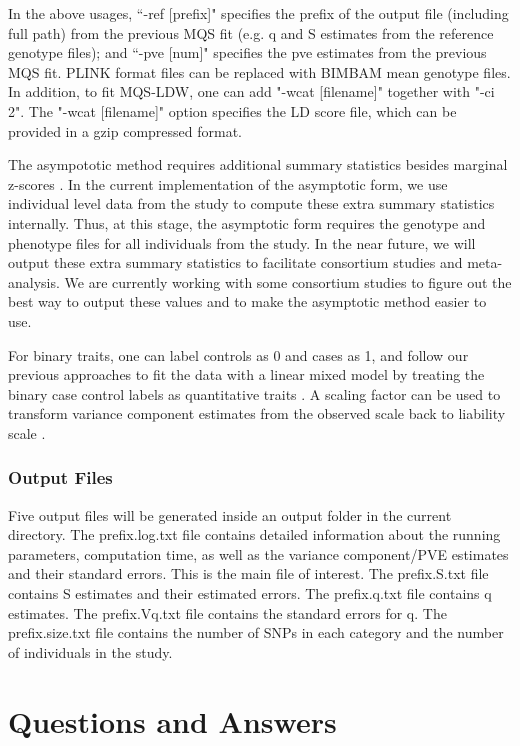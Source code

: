 \documentclass[11pt]{article}
\begin{document}
In the above usages, ``-ref [prefix]" specifies the prefix of the
output file (including full path) from the previous MQS fit (e.g. q
and S estimates from the reference genotype files); and ``-pve [num]"
specifies the pve estimates from the previous MQS fit. PLINK format
files can be replaced with BIMBAM mean genotype files. In addition, to
fit MQS-LDW, one can add "-wcat [filename]" together with "-ci 2". The
"-wcat [filename]" option specifies the LD score file, which can be
provided in a gzip compressed format.

The asympototic method requires additional summary statistics besides
marginal z-scores \cite{Zhou:2016}. In the current implementation of
the asymptotic form, we use individual level data from the study to
compute these extra summary statistics internally. Thus, at this
stage, the asymptotic form requires the genotype and phenotype files
for all individuals from the study. In the near future, we will output
these extra summary statistics to facilitate consortium studies and
meta-analysis. We are currently working with some consortium studies
to figure out the best way to output these values and to make the
asymptotic method easier to use.

For binary traits, one can label controls as 0 and cases as 1, and
follow our previous approaches to fit the data with a linear mixed
model by treating the binary case control labels as quantitative
traits \cite{Zhou:2013}. A scaling factor can be used to transform
variance component estimates from the observed scale back to liability
scale \cite{Zhou:2013}.

\subsubsection{Output Files}

Five output files will be generated inside an output folder in the
current directory. The prefix.log.txt file contains detailed
information about the running parameters, computation time, as well as
the variance component/PVE estimates and their standard errors. This
is the main file of interest. The prefix.S.txt file contains S
estimates and their estimated errors. The prefix.q.txt file contains q
estimates. The prefix.Vq.txt file contains the standard errors for
q. The prefix.size.txt file contains the number of SNPs in each
category and the number of individuals in the study.

\clearpage
\newpage

\section{Questions and Answers}
\end{document}
